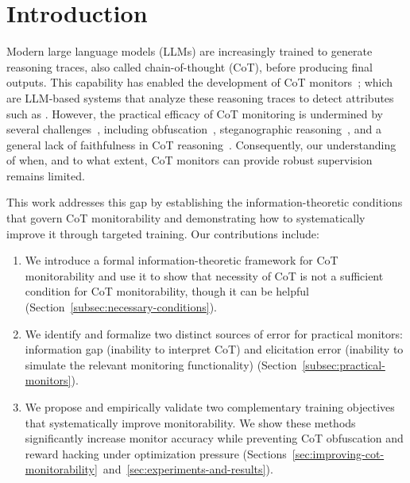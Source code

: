 \documentclass{article}
\theoremstyle{plain}
\begin{document}
\section{Introduction}
Modern large language models (LLMs) are increasingly trained to generate reasoning traces, also called chain-of-thought (CoT), before producing final outputs.
This capability has enabled the development of CoT monitors~\citep{korbak2025chainthoughtmonitorabilitynew}; which are LLM-based systems that analyze these reasoning traces to detect attributes such as .
However, the practical efficacy of CoT monitoring is undermined by several challenges~\citep{barez2025chain}, including obfuscation~\citep{baker2025monitoringreasoningmodelsmisbehavior}, steganographic reasoning~\citep{cooper2025gendistransfer}, and a general lack of faithfulness in CoT reasoning~\citep{turpin2023languagemodelsdontsay, lanham2023measuringfaithfulnesschainofthoughtreasoning}. 
Consequently, our understanding of when, and to what extent, CoT monitors can provide robust supervision remains limited.

This work addresses this gap by establishing the information-theoretic conditions that govern CoT monitorability and demonstrating how to systematically improve it through targeted training. Our contributions include:
\begin{enumerate}
\item We introduce a formal information-theoretic framework for CoT monitorability and use it to show that necessity of CoT is not a sufficient condition for CoT monitorability, though it can be helpful (Section~\ref{subsec:necessary-conditions}).
\item We identify and formalize two distinct sources of error for practical monitors: information gap (inability to interpret CoT) and elicitation error (inability to simulate the relevant monitoring functionality) (Section~\ref{subsec:practical-monitors}).
\item We propose and empirically validate two complementary training objectives that systematically improve monitorability. We show these methods significantly increase monitor accuracy while preventing CoT obfuscation and reward hacking under optimization pressure (Sections~\ref{sec:improving-cot-monitorability}~and~\ref{sec:experiments-and-results}).
\end{enumerate}
\end{document}
